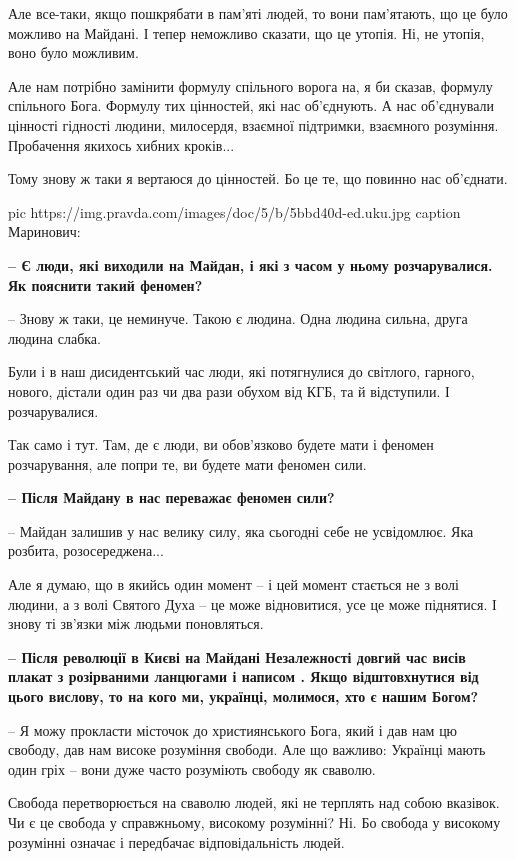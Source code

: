 Але все-таки, якщо пошкрябати в пам'яті людей, то вони пам’ятають, що це було
можливо на Майдані. І тепер неможливо сказати, що це утопія. Ні, не утопія,
воно було можливим.

Але нам потрібно замінити формулу спільного ворога на, я би сказав, формулу
спільного Бога. Формулу тих цінностей, які нас об’єднують. А нас об’єднували
цінності гідності людини, милосердя, взаємної підтримки, взаємного розуміння.
Пробачення якихось хибних кроків...

Тому знову ж таки я вертаюся до цінностей. Бо це те, що повинно нас об’єднати.

\ifcmt
pic https://img.pravda.com/images/doc/5/b/5bbd40d-ed.uku.jpg 
caption Маринович: 
\fi

{\bfseries 
– Є люди, які виходили на Майдан, і які з часом у ньому розчарувалися. Як пояснити такий феномен?
}

– Знову ж таки, це неминуче. Такою є людина. Одна людина сильна, друга людина слабка. 

Були і в наш дисидентський час люди, які потягнулися до світлого, гарного, нового, дістали один раз чи два рази обухом від КГБ, та й відступили. І розчарувалися. 

Так само і тут. Там, де є люди, ви обов’язково будете мати і феномен розчарування, але попри те, ви будете мати феномен сили.

{\bfseries 
– Після Майдану в нас переважає феномен сили?
}

– Майдан залишив у нас велику силу, яка сьогодні себе не усвідомлює. Яка розбита, розосереджена... 

Але я думаю, що в якийсь один момент – і цей момент стається не з волі людини,
а з волі Святого Духа – це може відновитися, усе це може піднятися. І знову ті
зв’язки між людьми поновляться.

\textbf{– Після революції в Києві на Майдані Незалежності довгий час висів плакат з
розірваними ланцюгами і написом . Якщо
відштовхнутися від цього вислову, то на кого ми, українці, молимося, хто є
нашим Богом?}

– Я можу прокласти місточок до християнського Бога, який і дав нам цю свободу,
дав нам високе розуміння свободи. Але що важливо: Українці мають один гріх –
вони дуже часто розуміють свободу як сваволю.

Свобода перетворюється на сваволю людей, які не терплять над собою вказівок. Чи
є це свобода у справжньому, високому розумінні? Ні. Бо свобода у високому
розумінні означає і передбачає відповідальність людей. 

